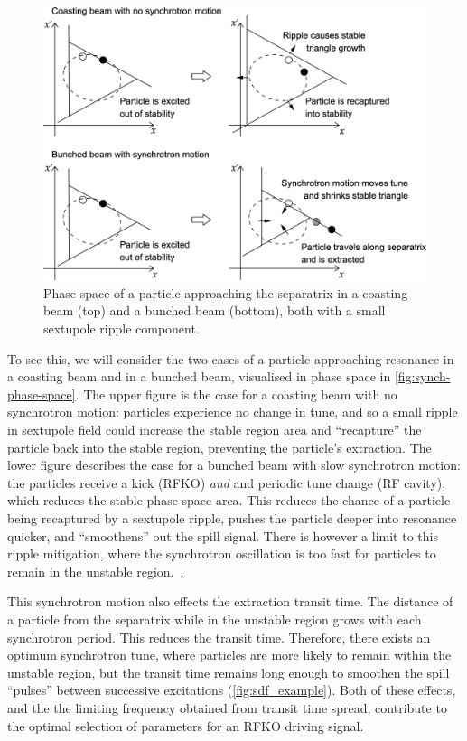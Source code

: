 \documentclass[11pt]{report}
\begin{document}
\begin{figure}
  \centering
  \includegraphics*[width=0.7\linewidth]{synch-phase-space.png}
  \caption{Phase space of a particle approaching the separatrix in a coasting beam (top) and a bunched beam (bottom), both with a small sextupole ripple component.}
  \label{fig:synch-phase-space}
\end{figure}

To see this, we will consider the two cases of a particle approaching resonance in a coasting beam and in a bunched beam, visualised in phase space in \autoref{fig:synch-phase-space}. The upper figure is the case for a coasting beam with no synchrotron motion: particles experience no change in tune, and so a small ripple in sextupole field could increase the stable region area and ``recapture'' the particle back into the stable region, preventing the particle's extraction. The lower figure describes the case for a bunched beam with slow synchrotron motion: the particles receive a kick (RFKO) \textit{and} and periodic tune change (RF cavity), which reduces the stable phase space area. This reduces the chance of a particle being recaptured by a sextupole ripple, pushes the particle deeper into resonance quicker, and ``smoothens'' out the spill signal. There is however a limit to this ripple mitigation, where the synchrotron oscillation is too fast for particles to remain in the unstable region.~\cite{Sorge_2018,PhysRevAccelBeams.26.014402}.

This synchrotron motion also effects the extraction transit time. The distance of a particle from the separatrix while in the unstable region grows with each synchrotron period. This reduces the transit time. Therefore, there exists an optimum synchrotron tune, where particles are more likely to remain within the unstable region, but the transit time remains long enough to smoothen the spill ``pulses'' between successive excitations (\autoref{fig:sdf_example}). Both of these effects, and the the limiting frequency obtained from transit time spread, contribute to the optimal selection of parameters for an RFKO driving signal.
\end{document}
